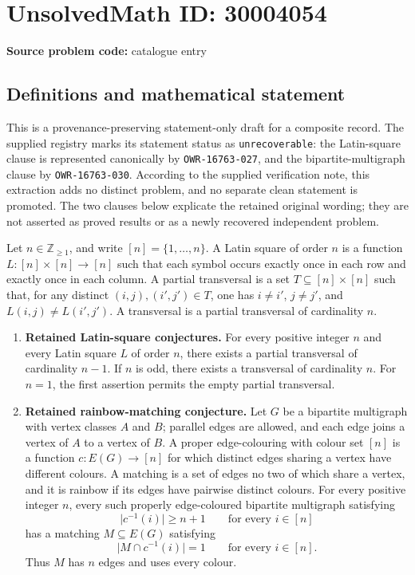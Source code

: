 \documentclass[11pt]{article}
\newcommand{\Z}{\mathbb{Z}}
\begin{document}
\section*{UnsolvedMath ID: 30004054}
\textbf{Source problem code:} catalogue entry
\subsection{Definitions and mathematical statement}
This is a provenance-preserving statement-only draft for a composite record. The supplied registry marks its statement status as \texttt{unrecoverable}: the Latin-square clause is represented canonically by \texttt{OWR-16763-027}, and the bipartite-multigraph clause by \texttt{OWR-16763-030}. According to the supplied verification note, this extraction adds no distinct problem, and no separate clean statement is promoted. The two clauses below explicate the retained original wording; they are not asserted as proved results or as a newly recovered independent problem.

Let \(n\in\Z_{\geq 1}\), and write \([n]=\{1,\ldots,n\}\). A Latin square of order \(n\) is a function \(L:[n]\times[n]\to[n]\) such that each symbol occurs exactly once in each row and exactly once in each column. A partial transversal is a set \(T\subseteq[n]\times[n]\) such that, for any distinct \((i,j),(i',j')\in T\), one has \(i\ne i'\), \(j\ne j'\), and \(L(i,j)\ne L(i',j')\). A transversal is a partial transversal of cardinality \(n\).

\begin{enumerate}
\item \textbf{Retained Latin-square conjectures.} For every positive integer \(n\) and every Latin square \(L\) of order \(n\), there exists a partial transversal of cardinality \(n-1\). If \(n\) is odd, there exists a transversal of cardinality \(n\). For \(n=1\), the first assertion permits the empty partial transversal.
\item \textbf{Retained rainbow-matching conjecture.} Let \(G\) be a bipartite multigraph with vertex classes \(A\) and \(B\); parallel edges are allowed, and each edge joins a vertex of \(A\) to a vertex of \(B\). A proper edge-colouring with colour set \([n]\) is a function \(c:E(G)\to[n]\) for which distinct edges sharing a vertex have different colours. A matching is a set of edges no two of which share a vertex, and it is rainbow if its edges have pairwise distinct colours. For every positive integer \(n\), every such properly edge-coloured bipartite multigraph satisfying
\[
\lvert c^{-1}(i)\rvert\geq n+1\qquad\text{for every }i\in[n]
\]
has a matching \(M\subseteq E(G)\) satisfying
\[
\lvert M\cap c^{-1}(i)\rvert=1\qquad\text{for every }i\in[n].
\]
Thus \(M\) has \(n\) edges and uses every colour.
\end{enumerate}
\end{document}
